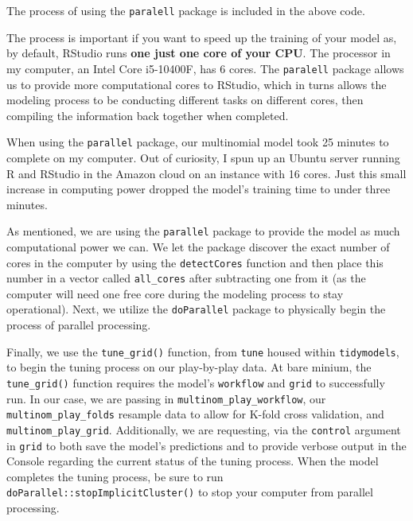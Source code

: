 \documentclass[
  letterpaper,
]{krantz}
\begin{document}
\begin{tcolorbox}[enhanced jigsaw, left=2mm, toprule=.15mm, opacitybacktitle=0.6, leftrule=.75mm, bottomrule=.15mm, colbacktitle=quarto-callout-warning-color!10!white, breakable, colback=white, bottomtitle=1mm, toptitle=1mm, title=\textcolor{quarto-callout-warning-color}{\faExclamationTriangle}\hspace{0.5em}{Warning}, coltitle=black, titlerule=0mm, arc=.35mm, opacityback=0, colframe=quarto-callout-warning-color-frame, rightrule=.15mm]

The process of using the \texttt{paralell} package is included in the
above code.

The process is important if you want to speed up the training of your
model as, by default, RStudio runs \textbf{one just one core of your
CPU}. The processor in my computer, an Intel Core i5-10400F, has 6
cores. The \texttt{paralell} package allows us to provide more
computational cores to RStudio, which in turns allows the modeling
process to be conducting different tasks on different cores, then
compiling the information back together when completed.

When using the \texttt{parallel} package, our multinomial model took 25
minutes to complete on my computer. Out of curiosity, I spun up an
Ubuntu server running R and RStudio in the Amazon cloud on an instance
with 16 cores. Just this small increase in computing power dropped the
model's training time to under three minutes.

\end{tcolorbox}

As mentioned, we are using the \texttt{parallel} package to provide the
model as much computational power we can. We let the package discover
the exact number of cores in the computer by using the
\texttt{detectCores} function and then place this number in a vector
called \texttt{all\_cores} after subtracting one from it (as the
computer will need one free core during the modeling process to stay
operational). Next, we utilize the \texttt{doParallel} package to
physically begin the process of parallel processing.

Finally, we use the \texttt{tune\_grid()} function, from \texttt{tune}
housed within \texttt{tidymodels}, to begin the tuning process on our
play-by-play data. At bare minium, the \texttt{tune\_grid()} function
requires the model's \texttt{workflow} and \texttt{grid} to successfully
run. In our case, we are passing in \texttt{multinom\_play\_workflow},
our \texttt{multinom\_play\_folds} resample data to allow for K-fold
cross validation, and \texttt{multinom\_play\_grid}. Additionally, we
are requesting, via the \texttt{control} argument in \texttt{grid} to
both save the model's predictions and to provide verbose output in the
Console regarding the current status of the tuning process. When the
model completes the tuning process, be sure to run
\texttt{doParallel::stopImplicitCluster()} to stop your computer from
parallel processing.
\end{document}
